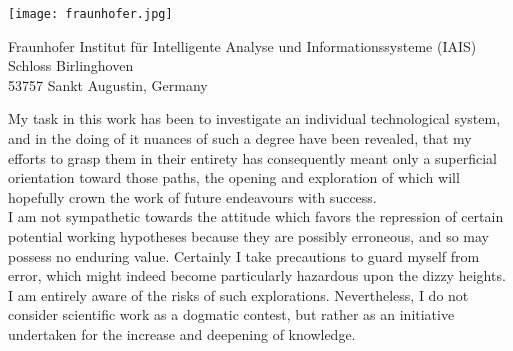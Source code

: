 \thispagestyle{empty}
\vspace*{3cm}


\begin{center}
\texttt{[image: fraunhofer.jpg]}
\end{center}

\vspace*{0.2cm}

\begin{center}
Fraunhofer Institut f{\"u}r Intelligente Analyse und Informationssysteme (IAIS)\\
Schloss Birlinghoven\\
53757 Sankt Augustin, Germany\\
\end{center}
\vspace*{0.5cm}


\noindent{}My task in this work has been to investigate an individual technological system, and in the doing of it nuances of such a degree have been revealed, that my efforts to grasp them in their entirety has consequently meant only a superficial orientation toward those paths, the opening and exploration of which will hopefully crown the work of future endeavours with success. \\

\noindent{}I am not sympathetic towards the attitude which favors the repression of certain potential working hypotheses because they are possibly erroneous, and so may possess no enduring value.
Certainly I take precautions to guard myself from error, which might indeed become particularly hazardous upon the dizzy heights. I am entirely aware of the risks of such explorations. 
Nevertheless, I do not consider scientific work as a dogmatic contest, but rather as an initiative undertaken for the increase and deepening of knowledge.\\

